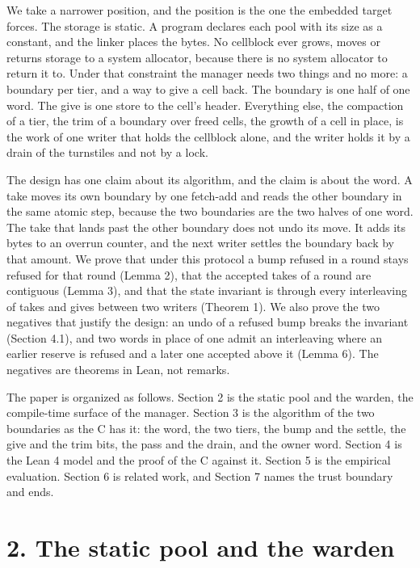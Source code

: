We take a narrower position, and the position is the one the embedded target forces. The storage is static. A program declares each pool with its size as a constant, and the linker places the bytes. No cellblock ever grows, moves or returns storage to a system allocator, because there is no system allocator to return it to. Under that constraint the manager needs two things and no more: a boundary per tier, and a way to give a cell back. The boundary is one half of one word. The give is one store to the cell's header. Everything else, the compaction of a tier, the trim of a boundary over freed cells, the growth of a cell in place, is the work of one writer that holds the cellblock alone, and the writer holds it by a drain of the turnstiles and not by a lock.

The design has one claim about its algorithm, and the claim is about the word. A take moves its own boundary by one fetch-add and reads the other boundary in the same atomic step, because the two boundaries are the two halves of one word. The take that lands past the other boundary does not undo its move. It adds its bytes to an overrun counter, and the next writer settles the boundary back by that amount. We prove that under this protocol a bump refused in a round stays refused for that round (Lemma 2), that the accepted takes of a round are contiguous (Lemma 3), and that the state invariant is through every interleaving of takes and gives between two writers (Theorem 1). We also prove the two negatives that justify the design: an undo of a refused bump breaks the invariant (Section 4.1), and two words in place of one admit an interleaving where an earlier reserve is refused and a later one accepted above it (Lemma 6). The negatives are theorems in Lean, not remarks.

The paper is organized as follows. Section 2 is the static pool and the warden, the compile-time surface of the manager. Section 3 is the algorithm of the two boundaries as the C has it: the word, the two tiers, the bump and the settle, the give and the trim bits, the pass and the drain, and the owner word. Section 4 is the Lean 4 model and the proof of the C against it. Section 5 is the empirical evaluation. Section 6 is related work, and Section 7 names the trust boundary and ends.

\section{\texorpdfstring{2. The static pool and the warden}{2. The static pool and the warden}}

